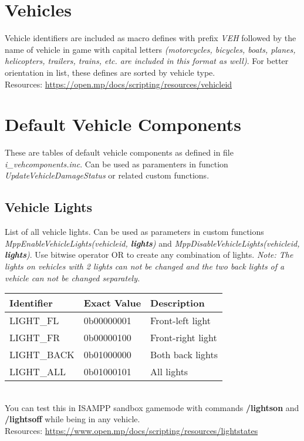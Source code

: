 \documentclass{article}
\begin{document}
\section{Vehicles}
Vehicle identifiers are included as macro defines with prefix \textit{VEH} followed by the name of vehicle in game with capital letters \textit{(motorcycles, bicycles, boats, planes, helicopters, trailers, trains, etc. are included in this format as well)}. For better orientation in list, these defines are sorted by vehicle type.
\bigskip
\\Resources: \url{https://open.mp/docs/scripting/resources/vehicleid}


\newpage
\section{Default Vehicle Components}
These are tables of default vehicle components as defined in file \textit{i\_vehcomponents.inc}. Can be used as paramenters in function \textit{UpdateVehicleDamageStatus} or related custom functions.

\subsection{Vehicle Lights}
\begin{sloppypar}
List of all vehicle lights. Can be used as parameters in custom functions \textit{MppEnableVehicleLights(vehicleid, \textbf{lights})} and \textit{MppDisableVehicleLights(vehicleid, \textbf{lights})}. Use bitwise operator OR to create any combination of lights. \textit{Note: The lights on vehicles with 2 lights can not be changed and the two back lights of a vehicle can not be changed separately.}
\end{sloppypar}
\bigskip
\noindent\begin{tabular}{ |l|l|l| } 
\hline
Identifier & Exact Value & Description \\
\hline
LIGHT\_FL & 0b00000001 & Front-left light \\ 
LIGHT\_FR & 0b00000100 & Front-right light \\ 
LIGHT\_BACK & 0b01000000 & Both back lights \\ 
LIGHT\_ALL & 0b01000101 & All lights \\ 
\hline
\end{tabular}
\bigskip
\\You can test this in ISAMPP sandbox gamemode with commands \textbf{/lightson} and \textbf{/lightsoff} while being in any vehicle.
\bigskip
\\Resources: \url{https://www.open.mp/docs/scripting/resources/lightstates}
\end{document}
